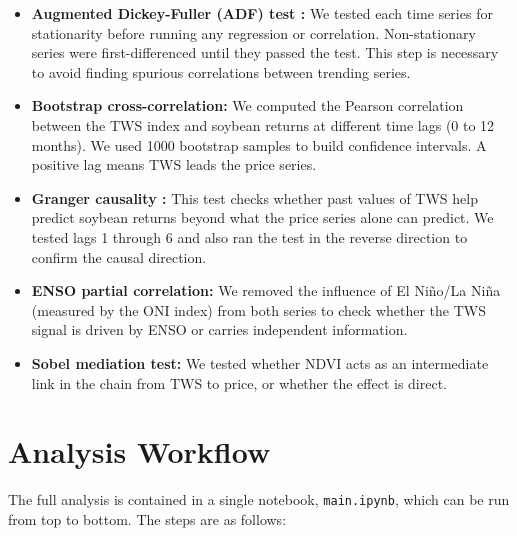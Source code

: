 \documentclass[10pt, twocolumn]{article}
\begin{document}
\begin{itemize}
  \item \textbf{Augmented Dickey-Fuller (ADF) test \cite{dickey1979distribution}:} We tested each
        time series for stationarity before running any regression
        or correlation. Non-stationary series were first-differenced
        until they passed the test. This step is necessary to avoid
        finding spurious correlations between trending series.
  \item \textbf{Bootstrap cross-correlation:} We computed the
        Pearson correlation between the TWS index and soybean
        returns at different time lags (0 to 12 months). We used
        1000 bootstrap samples to build confidence intervals.
        A positive lag means TWS leads the price series.
  \item \textbf{Granger causality \cite{granger1969investigating}:} This test checks whether past
        values of TWS help predict soybean returns beyond what the
        price series alone can predict. We tested lags 1 through 6
        and also ran the test in the reverse direction to confirm
        the causal direction.
  \item \textbf{ENSO partial correlation:} We removed the influence
        of El Niño/La Niña (measured by the ONI index) from both
        series to check whether the TWS signal is driven by ENSO
        or carries independent information.
  \item \textbf{Sobel mediation test:} We tested whether NDVI acts
        as an intermediate link in the chain from TWS to price, or
        whether the effect is direct.
\end{itemize}

\section{Analysis Workflow}
\label{sec:workflow}

The full analysis is contained in a single notebook,
\texttt{main.ipynb}, which can be run from top to bottom. The steps
are as follows:
\end{document}
